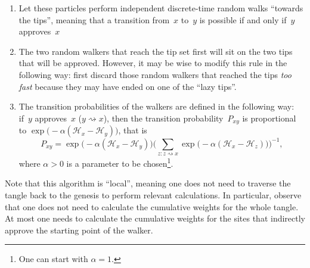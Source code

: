 \documentclass[12pt]{article}
\newcommand{\HH}{\mathcal{H}}
\begin{document}
\begin{CJK}{UTF8}{bkai}
\begin{enumerate}
 \item Let these particles perform independent
 discrete-time random
 walks ``towards the tips'', meaning that a transition
  from~$x$ to~$y$
is possible if and only if~$y$ approves~$x$
 \item The two random walkers that reach the tip set first will
sit on the two tips that will be approved.
However, it may be wise to modify this rule in the 
following way: first discard those random walkers that 
reached the tips \emph{too fast} because they may have ended on one
of the ``lazy tips''.
 \item The transition probabilities
 of the walkers are defined in the following
 way: if~$y$ approves~$x$ ($y\rightsquigarrow x$), 
then the transition probability~$P_{xy}$
 is proportional to $\exp\big(-\alpha(\HH_x-\HH_y)\big)$,
that is
 \begin{equation}
  \label{trans_probs}
   P_{xy} = \exp\big(-\alpha(\HH_x-\HH_y)\big)
\Big(\sum_{z: z \rightsquigarrow x}
 \exp\big(-\alpha(\HH_x-\HH_z)\big)\Big)^{-1},
 \end{equation}
where $\alpha>0$ is a parameter to be chosen\footnote{One can start 
with $\alpha=1$.}.
\end{enumerate}
Note that this algorithm is ``local'', meaning one does not need
 to traverse the tangle back to the genesis to perform relevant calculations.
In particular, 
observe that one does not need to calculate the cumulative
weights for the whole tangle. At most one needs to calculate the 
cumulative weights 
for the sites that indirectly approve the starting point
of the walker.



\end{CJK}
\end{document}
